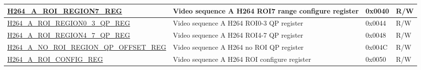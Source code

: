\begin{longtable}{ | p{7cm} | p{6.2cm} | p{1.2cm} | p{1cm} | }
\hyperref[regdesc:H264AROIREGION7REG]{H264\_A\_ROI\_REGION7\_REG} & Video sequence A H264 ROI7 range configure register & 0x0040 & R/W \\ \hline
\hyperref[regdesc:H264AROIREGION03QPREG]{H264\_A\_ROI\_REGION0\_3\_QP\_REG} & Video sequence A H264 ROI0-3 QP register & 0x0044 & R/W \\ \hline
\hyperref[regdesc:H264AROIREGION47QPREG]{H264\_A\_ROI\_REGION4\_7\_QP\_REG} & Video sequence A H264 ROI4-7 QP register & 0x0048 & R/W \\ \hline
\hyperref[regdesc:H264ANOROIREGIONQPOFFSETREG]{H264\_A\_NO\_ROI\_REGION\_QP\_OFFSET\_REG} & Video sequence A H264 no ROI QP register & 0x004C & R/W \\ \hline
\hyperref[regdesc:H264AROICONFIGREG]{H264\_A\_ROI\_CONFIG\_REG} & Video sequence A H264 ROI configure register & 0x0050 & R/W \\ \hline


\end{longtable}
